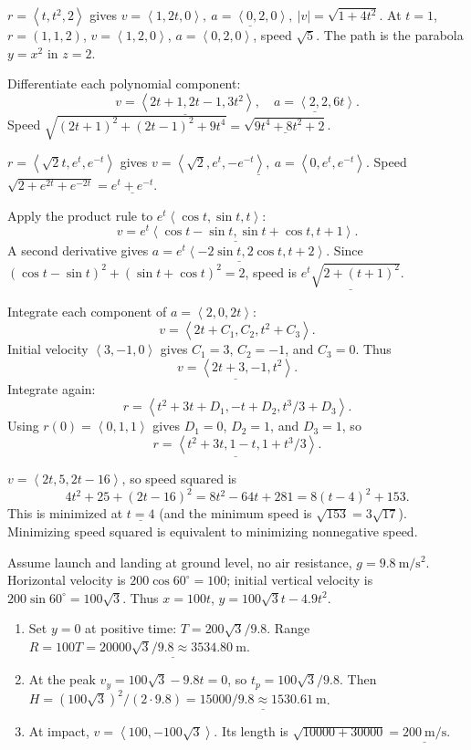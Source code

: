 \documentclass[10pt]{article}
\newcommand{\handstyleA}{\handA\fontsize{9.45}{11.35}\selectfont}
\newcommand{\handstyleB}{\handB\fontsize{9.35}{11.25}\selectfont}
\newcommand{\handstyleC}{\handC\fontsize{9.55}{11.45}\selectfont}
\newcommand{\ex}[1]{\par\addvspace{6pt}\noindent\llap{\makebox[.62in][r]{\large\bfseries #1.\hspace{.12in}}}\ignorespaces}
\newcommand{\ans}[1]{\underline{#1}}
\newcommand{\vv}[1]{\left\langle #1\right\rangle}
\begin{document}
\handstyleC
\ex{7}
$r=\vv{t,t^2,2}$ gives $\ans{v=\vv{1,2t,0},\ a=\vv{0,2,0},\ |v|=\sqrt{1+4t^2}}$. At $t=1$, $r=(1,1,2)$, $v=\vv{1,2,0}$, $a=\vv{0,2,0}$, speed $\sqrt5$. The path is the parabola $y=x^2$ in $z=2$.
\begin{center}\end{center}
\handstyleA
\ex{9}
Differentiate each polynomial component:
\[\ans{v=\vv{2t+1,2t-1,3t^2}},\quad\ans{a=\vv{2,2,6t}}.\]
Speed $\sqrt{(2t+1)^2+(2t-1)^2+9t^4}=\ans{\sqrt{9t^4+8t^2+2}}$.
\handstyleB
\ex{11}
$r=\vv{\sqrt2t,e^t,e^{-t}}$ gives $\ans{v=\vv{\sqrt2,e^t,-e^{-t}},\ a=\vv{0,e^t,e^{-t}}}$. Speed $\sqrt{2+e^{2t}+e^{-2t}}=\ans{e^t+e^{-t}}$.
\handstyleA
\ex{13}
Apply the product rule to $e^t\vv{\cos t,\sin t,t}$:
\[\ans{v=e^t\vv{\cos t-\sin t,\sin t+\cos t,t+1}}.\]
A second derivative gives $\ans{a=e^t\vv{-2\sin t,2\cos t,t+2}}$. Since $(\cos t-\sin t)^2+(\sin t+\cos t)^2=2$, speed is $\ans{e^t\sqrt{2+(t+1)^2}}$.
\handstyleC
\ex{15}
Integrate each component of $a=\vv{2,0,2t}$:
\[v=\vv{2t+C_1,C_2,t^2+C_3}.\]
Initial velocity $\vv{3,-1,0}$ gives $C_1=3$, $C_2=-1$, and $C_3=0$. Thus
\[\ans{v=\vv{2t+3,-1,t^2}}.\]
Integrate again:
\[r=\vv{t^2+3t+D_1,-t+D_2,t^3/3+D_3}.\]
Using $r(0)=\vv{0,1,1}$ gives $D_1=0$, $D_2=1$, and $D_3=1$, so
\[\ans{r=\vv{t^2+3t,1-t,1+t^3/3}}.\]
\handstyleA
\ex{19}
$v=\vv{2t,5,2t-16}$, so speed squared is
\[4t^2+25+(2t-16)^2=8t^2-64t+281=8(t-4)^2+153.\]
This is minimized at $\ans{t=4}$ (and the minimum speed is $\sqrt{153}=3\sqrt{17}$). Minimizing speed squared is equivalent to minimizing nonnegative speed.
\handstyleB
\ex{23}
Assume launch and landing at ground level, no air resistance, $g=9.8\ \mathrm{m/s^2}$. Horizontal velocity is $200\cos60^\circ=100$; initial vertical velocity is $200\sin60^\circ=100\sqrt3$. Thus $x=100t$, $y=100\sqrt3t-4.9t^2$.
\begin{enumerate}[label=(\alph*)]
\item Set $y=0$ at positive time: $T=200\sqrt3/9.8$. Range $R=100T=\ans{20000\sqrt3/9.8\approx3534.80\ \mathrm m}$.
\item At the peak $v_y=100\sqrt3-9.8t=0$, so $t_p=100\sqrt3/9.8$. Then $H=(100\sqrt3)^2/(2\cdot9.8)=\ans{15000/9.8\approx1530.61\ \mathrm m}$.
\item At impact, $v=\vv{100,-100\sqrt3}$. Its length is $\sqrt{10000+30000}=\ans{200\ \mathrm{m/s}}$.
\end{enumerate}
\end{document}
